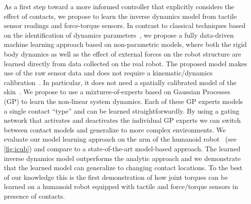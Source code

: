 As a first step toward a more informed controller that explicitly considers the effect of contacts, we propose 
%
%
to learn the inverse dynamics model from tactile sensor readings and force-torque sensors. 
%
In contrast to classical techniques based on the identification of dynamics parameters~\cite{Yamane2011calibration,Ogawa2014,traversaro2013inertial},
we propose a fully data-driven machine learning approach based on non-parametric models,
where both the rigid body dynamics as well as the effect of external forces on the
robot structure are learned directly from data collected on the real robot.
%
The proposed model makes use of the raw sensor data and does not require a kinematic/dynamics calibration~\cite{Yamane2011calibration,Ogawa2014,traversaro2013inertial}. 
In particular, it does not need a spatially calibrated model of the skin~\cite{DelPrete2011}.
%
We propose to use a mixtures-of-experts based on Gaussian Processes (GP) to learn the non-linear system dynamics.
Each of these GP experts models a single contact ``type'' and can be learned straightforwardly.
By using a gating network that activates and deactivates the individual GP experts we can switch between contact models and generalize to more complex environments.
We evaluate our model learning approach on the arm of the \robot{} humanoid robot~\cite{Natale2013} (see \fig\ref{fig:icub}) and compare to a state-of-the-art model-based approach.
The learned inverse dynamics model outperforms the analytic approach and we demonstrate that the learned model can generalize to changing contact locations.
To the best of our knowledge this is the first demonstration of how joint torques can be learned on a humanoid robot equipped with tactile and force/torque sensors in presence of contacts.




